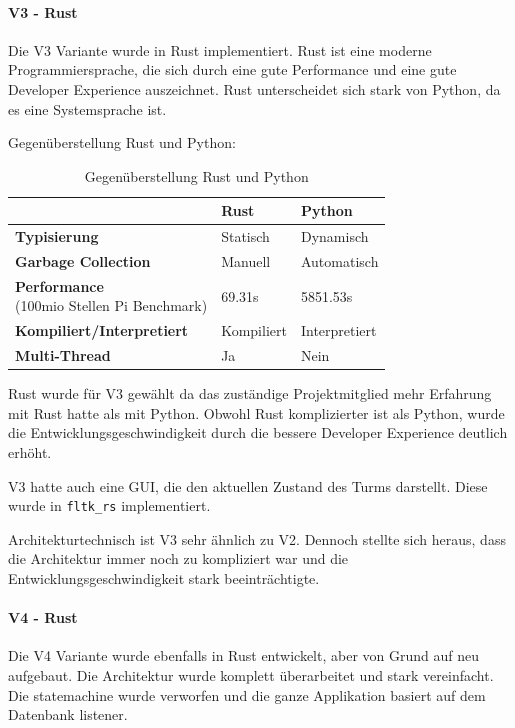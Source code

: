 \paragraph{V3 - Rust}
Die V3 Variante wurde in Rust implementiert. Rust ist eine moderne Programmiersprache, die sich durch eine gute Performance und eine gute Developer Experience auszeichnet. Rust unterscheidet sich stark von Python, da es eine Systemsprache ist.

Gegenüberstellung Rust und Python:
\begin{table}[ht]
  \begin{tabular}{l|l|l}
                                      & \textbf{Rust} & \textbf{Python} \\
    \hline
    \textbf{Typisierung}              & Statisch      & Dynamisch       \\
    \textbf{Garbage Collection}       & Manuell       & Automatisch     \\
    \makecell[l]{\textbf{Performance }                                  \\(100mio Stellen Pi Benchmark\cite{programming_language_speeds})}
                                      & 69.31s        & 5851.53s        \\
    \textbf{Kompiliert/Interpretiert} & Kompiliert    & Interpretiert   \\
    \textbf{Multi-Thread}             & Ja            & Nein            \\
  \end{tabular}
  \caption{Gegenüberstellung Rust und Python}
  \label{tab:rust_vs_python}
\end{table}

Rust wurde für V3 gewählt da das zuständige Projektmitglied mehr Erfahrung mit Rust hatte als mit Python. Obwohl Rust komplizierter ist als Python, wurde die Entwicklungsgeschwindigkeit durch die bessere Developer Experience deutlich erhöht.

V3 hatte auch eine \ac{GUI}, die den aktuellen Zustand des Turms darstellt. Diese wurde in \texttt{fltk\_rs} implementiert.

Architekturtechnisch ist V3 sehr ähnlich zu V2. Dennoch stellte sich heraus, dass die Architektur immer noch zu kompliziert war und die Entwicklungsgeschwindigkeit stark beeinträchtigte.


\paragraph{V4 - Rust}

Die V4 Variante wurde ebenfalls in Rust entwickelt, aber von Grund auf neu aufgebaut. Die Architektur wurde komplett überarbeitet und stark vereinfacht. Die \Gls{statemachine} wurde verworfen und die ganze Applikation basiert auf dem Datenbank \Gls{listener}.